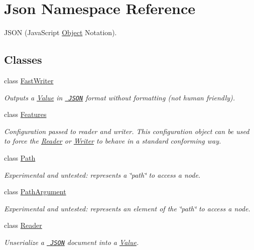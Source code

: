 \hypertarget{namespace_json}{}\section{Json Namespace Reference}
\label{namespace_json}


J\+S\+ON (Java\+Script \mbox{\hyperlink{class_object}{Object}} Notation).  


\subsection*{Classes}
\begin{DoxyCompactItemize}
\item 
class \mbox{\hyperlink{class_json_1_1_fast_writer}{Fast\+Writer}}
\begin{DoxyCompactList}\small\item\em Outputs a \mbox{\hyperlink{class_json_1_1_value}{Value}} in \href{http://www.json.org}{\texttt{ J\+S\+ON}} format without formatting (not human friendly). \end{DoxyCompactList}\item 
class \mbox{\hyperlink{class_json_1_1_features}{Features}}
\begin{DoxyCompactList}\small\item\em Configuration passed to reader and writer. This configuration object can be used to force the \mbox{\hyperlink{class_json_1_1_reader}{Reader}} or \mbox{\hyperlink{class_json_1_1_writer}{Writer}} to behave in a standard conforming way. \end{DoxyCompactList}\item 
class \mbox{\hyperlink{class_json_1_1_path}{Path}}
\begin{DoxyCompactList}\small\item\em Experimental and untested\+: represents a \char`\"{}path\char`\"{} to access a node. \end{DoxyCompactList}\item 
class \mbox{\hyperlink{class_json_1_1_path_argument}{Path\+Argument}}
\begin{DoxyCompactList}\small\item\em Experimental and untested\+: represents an element of the \char`\"{}path\char`\"{} to access a node. \end{DoxyCompactList}\item 
class \mbox{\hyperlink{class_json_1_1_reader}{Reader}}
\begin{DoxyCompactList}\small\item\em Unserialize a \href{http://www.json.org}{\texttt{ J\+S\+ON}} document into a \mbox{\hyperlink{class_json_1_1_value}{Value}}. \end{DoxyCompactList}\item 

\end{DoxyCompactItemize}
